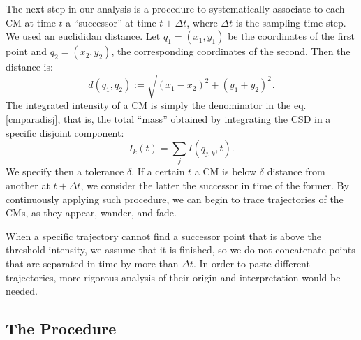 \documentclass{article}
\begin{document}
The next step in our analysis is a procedure to systematically associate to each CM at time $t$ a ``successor'' at time $t+\Delta t$, where $\Delta t$ is the sampling time step. We used an euclididan distance. Let $q_1=(x_1, y_1)$ be the coordinates of the first point and $q_2=(x_2,y_2)$, the corresponding coordinates of the second. Then the distance is:
\begin{equation}
d(q_1,q_2):=\sqrt{(x_1-x_2)^2+(y_1+y_2)^2}.
\end{equation}
The integrated intensity of a CM is simply the denominator in the eq. \ref{cmparadisj}, that is, the total ``mass'' obtained by integrating the CSD in a specific disjoint component:
\begin{equation}
  I_k(t)=\sum_j I (q_{j,k}, t).
\end{equation}
We specify then a tolerance $\delta$. If a certain $t$ a CM is below $\delta$ distance from another at $t+\Delta t$, we consider the latter the successor in time of the former. By continuously applying such procedure, we can begin to trace trajectories of the CMs, as they appear, wander, and fade. 

When a specific trajectory cannot find a successor point that is above the
threshold intensity, we assume that it is finished, so we do not concatenate
points that are separated in time by more than $\Delta t$. In order to paste different
trajectories, more rigorous analysis of their origin and interpretation would be needed.

 
 \subsection{The Procedure}
 
\end{document}
